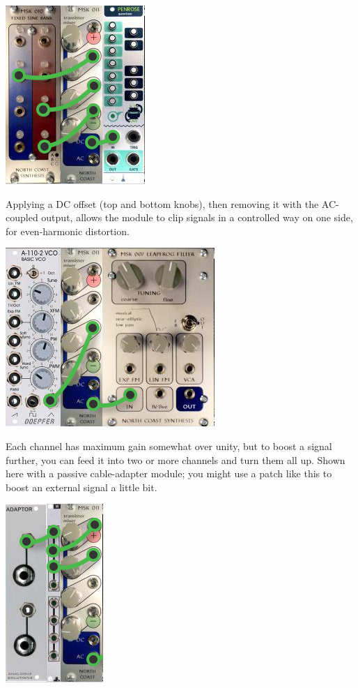 \nopagebreak\noindent
{\hspace*{\fill}\includegraphics[scale=0.6]{patch2.png}\hspace*{\fill}\par} 

Applying a DC offset (top and bottom knobs), then removing it with the
AC-coupled output, allows the module to clip signals in a controlled way on
one side, for even-harmonic distortion.

\nopagebreak\noindent
{\hspace*{\fill}\includegraphics[scale=0.6]{patch3.png}\hspace*{\fill}\par} 

Each channel has maximum gain somewhat over unity, but to boost a signal
further, you can feed it into two or more channels and turn them all up. 
Shown here with a passive cable-adapter module; you might use a patch like
this to boost an external signal a little bit.

\nopagebreak\noindent
{\hspace*{\fill}\includegraphics[scale=0.6]{patch4.png}\hspace*{\fill}\par} 

